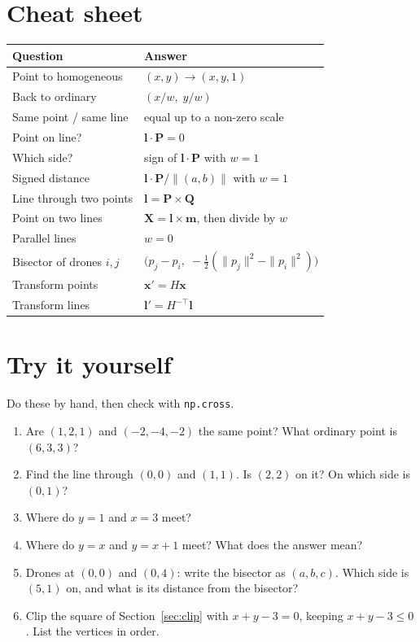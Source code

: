 \documentclass[11pt,a4paper]{article}
\newcommand{\vect}[1]{\mathbf{#1}}
\newcommand{\vP}{\vect{P}}
\newcommand{\vQ}{\vect{Q}}
\newcommand{\vl}{\vect{l}}
\newcommand{\vm}{\vect{m}}
\newcommand{\vX}{\vect{X}}
\begin{document}
\section{Cheat sheet}

\begin{center}
\renewcommand{\arraystretch}{1.25}
\begin{tabular}{ll}
\toprule
\textbf{Question} & \textbf{Answer}\\
\midrule
Point to homogeneous & $(x,y)\to(x,y,1)$\\
Back to ordinary & $(x/w,\;y/w)$\\
Same point / same line & equal up to a non-zero scale\\
Point on line? & $\vl\cdot\vP=0$\\
Which side? & sign of $\vl\cdot\vP$ with $w=1$\\
Signed distance & $\vl\cdot\vP/\|(a,b)\|$ with $w=1$\\
Line through two points & $\vl=\vP\times\vQ$\\
Point on two lines & $\vX=\vl\times\vm$, then divide by $w$\\
Parallel lines & $w=0$\\
Bisector of drones $i,j$ & $\big(p_j-p_i,\;-\tfrac12(\|p_j\|^2-\|p_i\|^2)\big)$\\
Transform points & $\vect{x}'=H\vect{x}$\\
Transform lines & $\vl'=H^{-\top}\vl$\\
\bottomrule
\end{tabular}
\end{center}

\section{Try it yourself}

Do these by hand, then check with \texttt{np.cross}.
\begin{enumerate}
\item Are $(1,2,1)$ and $(-2,-4,-2)$ the same point? What ordinary point is $(6,3,3)$?
\item Find the line through $(0,0)$ and $(1,1)$. Is $(2,2)$ on it? On which side is $(0,1)$?
\item Where do $y=1$ and $x=3$ meet?
\item Where do $y=x$ and $y=x+1$ meet? What does the answer mean?
\item Drones at $(0,0)$ and $(0,4)$: write the bisector as $(a,b,c)$. Which side is $(5,1)$ on, and what is its distance from the bisector?
\item Clip the square of Section~\ref{sec:clip} with $x+y-3=0$, keeping $x+y-3\le0$. List the vertices in order.
\end{enumerate}
\end{document}
